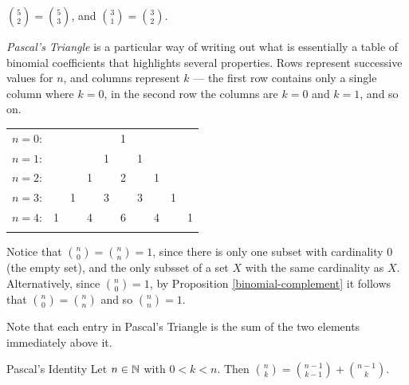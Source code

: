 \begin{exmp}
    $\binom{5}{2} = \binom{5}{3}$, and $\binom{3}{1} = \binom{3}{2}$.
\end{exmp}

\begin{defn}\label{pascals-triangle}
    \emph{Pascal's Triangle} is a particular way of writing out what is essentially a table of binomial coefficients that highlights several properties. Rows represent successive values for $n$, and columns represent $k$ --- the first row contains only a single column where $k=0$, in the second row the columns are $k=0$ and $k=1$, and so on.
    \begin{center}
        \begin{tabular}{rccccccccc}
            $n=0$:&    &    &    &    &  1\\\noalign{\smallskip\smallskip}
            $n=1$:&    &    &    &  1 &    &  1\\\noalign{\smallskip\smallskip}
            $n=2$:&    &    &  1 &    &  2 &    &  1\\\noalign{\smallskip\smallskip}
            $n=3$:&    &  1 &    &  3 &    &  3 &    &  1\\\noalign{\smallskip\smallskip}
            $n=4$:&  1 &    &  4 &    &  6 &    &  4 &    &  1\\\noalign{\smallskip\smallskip}
        \end{tabular}
    \end{center}
\end{defn}

\begin{rmk}
    Notice that $\binom{n}{0} = \binom{n}{n} = 1$, since there is only one subset with cardinality $0$ (the empty set), and the only subsset of a set $X$ with the same cardinality as $X$. Alternatively, since $\binom{n}{0} = 1$, by Proposition \ref{binomial-complement} it follows that $\binom{n}{0} = \binom{n}{n}$ and so $\binom{n}{n} = 1$.
\end{rmk}

\begin{rmk}
    Note that each entry in Pascal's Triangle is the sum of the two elements immediately above it.
\end{rmk}

\begin{prop}{Pascal's Identity}\label{pascals-identity}\proofbreak
    Let $n \in \mathbb{N}$ with $0 < k < n$. Then $\binom{n}{k} = \binom{n-1}{k-1} + \binom{n-1}{k}$.
\end{prop}

